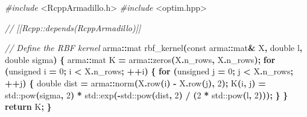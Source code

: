 \documentclass[
]{article}
\newenvironment{Shaded}{\begin{snugshade}}{\end{snugshade}}
\newcommand{\AttributeTok}[1]{\textcolor[rgb]{0.13,0.29,0.53}{#1}}
\newcommand{\BuiltInTok}[1]{#1}
\newcommand{\CommentTok}[1]{\textcolor[rgb]{0.56,0.35,0.01}{\textit{#1}}}
\newcommand{\ControlFlowTok}[1]{\textcolor[rgb]{0.13,0.29,0.53}{\textbf{#1}}}
\newcommand{\DataTypeTok}[1]{\textcolor[rgb]{0.13,0.29,0.53}{#1}}
\newcommand{\DecValTok}[1]{\textcolor[rgb]{0.00,0.00,0.81}{#1}}
\newcommand{\ImportTok}[1]{#1}
\newcommand{\NormalTok}[1]{#1}
\newcommand{\OperatorTok}[1]{\textcolor[rgb]{0.81,0.36,0.00}{\textbf{#1}}}
\newcommand{\PreprocessorTok}[1]{\textcolor[rgb]{0.56,0.35,0.01}{\textit{#1}}}
\begin{document}
\begin{Shaded}
\begin{Highlighting}[]
\PreprocessorTok{\#include }\ImportTok{\textless{}RcppArmadillo.h\textgreater{}}
\PreprocessorTok{\#include }\ImportTok{\textless{}optim.hpp\textgreater{}}

\CommentTok{// [[Rcpp::depends(RcppArmadillo)]]}

\CommentTok{// Define the RBF kernel}
\NormalTok{arma}\OperatorTok{::}\NormalTok{mat rbf\_kernel}\OperatorTok{(}\AttributeTok{const}\NormalTok{ arma}\OperatorTok{::}\NormalTok{mat}\OperatorTok{\&}\NormalTok{ X}\OperatorTok{,} \DataTypeTok{double}\NormalTok{ l}\OperatorTok{,} \DataTypeTok{double}\NormalTok{ sigma}\OperatorTok{)} \OperatorTok{\{}
\NormalTok{    arma}\OperatorTok{::}\NormalTok{mat K }\OperatorTok{=}\NormalTok{ arma}\OperatorTok{::}\NormalTok{zeros}\OperatorTok{(}\NormalTok{X}\OperatorTok{.}\NormalTok{n\_rows}\OperatorTok{,}\NormalTok{ X}\OperatorTok{.}\NormalTok{n\_rows}\OperatorTok{);}
    \ControlFlowTok{for} \OperatorTok{(}\DataTypeTok{unsigned}\NormalTok{ i }\OperatorTok{=} \DecValTok{0}\OperatorTok{;}\NormalTok{ i }\OperatorTok{\textless{}}\NormalTok{ X}\OperatorTok{.}\NormalTok{n\_rows}\OperatorTok{;} \OperatorTok{++}\NormalTok{i}\OperatorTok{)} \OperatorTok{\{}
        \ControlFlowTok{for} \OperatorTok{(}\DataTypeTok{unsigned}\NormalTok{ j }\OperatorTok{=} \DecValTok{0}\OperatorTok{;}\NormalTok{ j }\OperatorTok{\textless{}}\NormalTok{ X}\OperatorTok{.}\NormalTok{n\_rows}\OperatorTok{;} \OperatorTok{++}\NormalTok{j}\OperatorTok{)} \OperatorTok{\{}
            \DataTypeTok{double}\NormalTok{ dist }\OperatorTok{=}\NormalTok{ arma}\OperatorTok{::}\NormalTok{norm}\OperatorTok{(}\NormalTok{X}\OperatorTok{.}\NormalTok{row}\OperatorTok{(}\NormalTok{i}\OperatorTok{)} \OperatorTok{{-}}\NormalTok{ X}\OperatorTok{.}\NormalTok{row}\OperatorTok{(}\NormalTok{j}\OperatorTok{),} \DecValTok{2}\OperatorTok{);}
\NormalTok{            K}\OperatorTok{(}\NormalTok{i}\OperatorTok{,}\NormalTok{ j}\OperatorTok{)} \OperatorTok{=} \BuiltInTok{std::}\NormalTok{pow}\OperatorTok{(}\NormalTok{sigma}\OperatorTok{,} \DecValTok{2}\OperatorTok{)} \OperatorTok{*} \BuiltInTok{std::}\NormalTok{exp}\OperatorTok{({-}}\BuiltInTok{std::}\NormalTok{pow}\OperatorTok{(}\NormalTok{dist}\OperatorTok{,} \DecValTok{2}\OperatorTok{)} \OperatorTok{/} \OperatorTok{(}\DecValTok{2} \OperatorTok{*} \BuiltInTok{std::}\NormalTok{pow}\OperatorTok{(}\NormalTok{l}\OperatorTok{,} \DecValTok{2}\OperatorTok{)));}
        \OperatorTok{\}}
    \OperatorTok{\}}
    \ControlFlowTok{return}\NormalTok{ K}\OperatorTok{;}
\OperatorTok{\}}


\end{Highlighting}
\end{Shaded}
\end{document}
